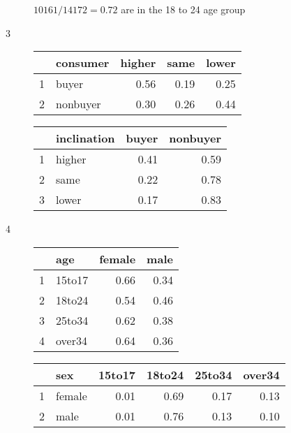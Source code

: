 \documentclass[landscape]{exam}
\begin{document}
\begin{description}
      $10161 / 14172 = 0.72$ are in the 18 to 24 age group

    \item[3]
      \begin{table}[H]
        \centering
        \begin{tabular}{rlrrr}
          \toprule
                   & consumer & higher & same & lower \\
          \midrule
          1        & buyer    & 0.56   & 0.19 & 0.25 \\
          2        & nonbuyer & 0.30   & 0.26 & 0.44 \\
          \bottomrule
        \end{tabular}
      \end{table}
                                
      \begin{table}[H]
      \centering
      \begin{tabular}{rlrr}
        \toprule
                 & inclination & buyer & nonbuyer \\
        \midrule
        1        & higher      & 0.41  & 0.59 \\
        2        & same        & 0.22  & 0.78 \\
        3        & lower       & 0.17  & 0.83 \\
        \bottomrule
      \end{tabular}
      \end{table}

    \item[4]
      \begin{table}[H]
        \centering
        \begin{tabular}{rlrr}
          \toprule
                   & age    & female & male \\
          \midrule
          1        & 15to17 & 0.66   & 0.34 \\
          2        & 18to24 & 0.54   & 0.46 \\
          3        & 25to34 & 0.62   & 0.38 \\
          4        & over34 & 0.64   & 0.36 \\
           \bottomrule
        \end{tabular}
      \end{table}

      \begin{table}[H]
        \centering
        \begin{tabular}{rlrrrr}
          \toprule
                   & sex    & 15to17 & 18to24 & 25to34 & over34 \\
          \midrule
          1        & female & 0.01   & 0.69   & 0.17   & 0.13 \\
          2        & male   & 0.01   & 0.76   & 0.13   & 0.10 \\
           \bottomrule
        \end{tabular}
      \end{table}
  \end{description}
\end{document}
